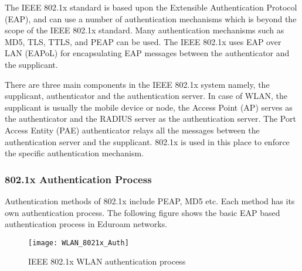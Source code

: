 The IEEE 802.1x standard is based upon the Extensible Authentication Protocol (EAP), and can use a number of authentication mechanisms which is beyond the scope of the IEEE 802.1x standard. Many authentication mechanisms such as MD5, TLS, TTLS, and PEAP can be used. The IEEE 802.1x uses EAP over LAN (EAPoL) for encapsulating EAP messages between the authenticator and the supplicant. 

There are three main components in the IEEE 802.1x system namely, the supplicant, authenticator and the authentication server. In case of WLAN, the supplicant is usually the mobile device or node, the Access Point (AP) serves as the authenticator and the RADIUS server as the authentication server.  The Port Access Entity (PAE) authenticator relays all the messages between the authentication server and the supplicant. 802.1x is used in this place to enforce the specific authentication mechanism. 

\subsubsection{802.1x Authentication Process} \label{WLAN_802.1x_auth}
Authentication methods of 802.1x include PEAP, MD5 etc. Each method has its own authentication process. The following figure shows the basic EAP based authentication process in Eduroam networks. 

\begin{figure}[H]
	\centering
	\texttt{[image: WLAN\_8021x\_Auth]}
	\caption {IEEE 802.1x WLAN authentication process \cite{WLAN_802.1x_img}}
	\label{fig:WLAN_802.1x_auth_img}
	\vspace{-10pt}
\end{figure}

